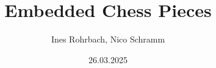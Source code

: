 
\title{Embedded Chess Pieces}
\newcommand{\subtitle}{Projekt-Dokumentation}

\newcommand{\thedate}{26.03.2025}
\date{\thedate}

\author{Ines Rohrbach, Nico Schramm}

\newcommand{\semester}{WiSe 24/25}
\newcommand{\module}{Softwareentwicklung für Eingebettete Systeme}

\newcommand{\prof}{Prof. Dr. rer. nat. Jens Wagner\\M. Eng. Marian Ulbricht}

\newcommand{\faculty}{Fakultät Informatik und Medien}
\newcommand{\university}{Hochschule für Technik, Wirtschaft und Kultur Leipzig}

\newcommand{\projecturl}{https://github.com/embedded-chess/embedded-chess-pieces/}

